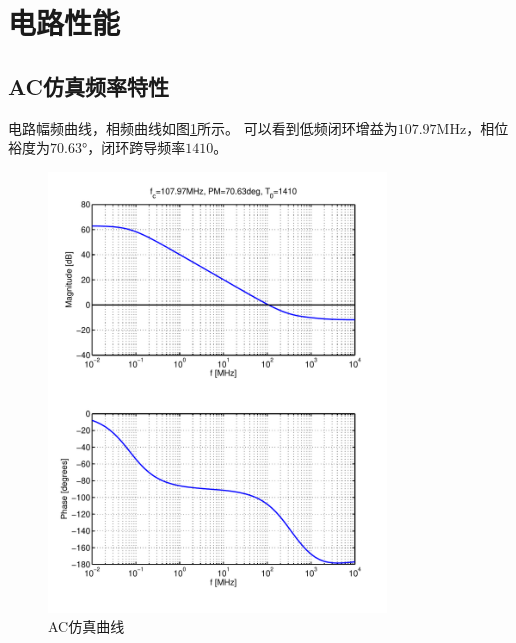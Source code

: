 \documentclass[a4paper]{article}
\newcommand{\uMHz}{\si{\mega\hertz}}
\newcommand{\udeg}{\si{\degree}}
\begin{document}
\newpage

\section{电路性能}
\subsection{AC仿真频率特性}
电路幅频曲线，相频曲线如图\ref{commonac}所示。
可以看到低频闭环增益为$107.97\uMHz$，相位裕度为$70.63\udeg$，闭环跨导频率$1410$。
\begin{figure}[htb]
    \begin{center}
        \includegraphics[width=0.8\textwidth]{common/ac.pdf}
    \end{center}
    \caption{AC仿真曲线}
    \label{commonac}
\end{figure}

\newpage
\clearpage
\end{document}
